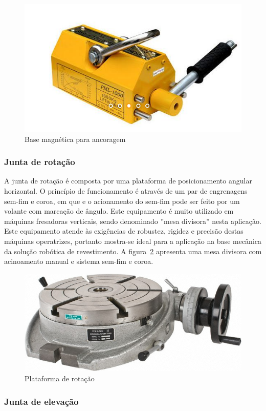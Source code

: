\begin{figure}[h!]
	\centering
	\includegraphics[width=0.5\columnwidth]{method/figs/construcao/base_magnetica}
	\caption{Base magnética para ancoragem}
    \label{fig::base_magnetica}
\end{figure}

\subsubsection{Junta de rotação}

A junta de rotação é composta por uma plataforma de posicionamento angular
horizontal.
O princípio de funcionamento é através de um par de engrenagens sem-fim e coroa,
em que e o acionamento do sem-fim pode ser feito por um volante com marcação de
ângulo. Este equipamento é muito utilizado em máquinas fresadoras verticais,
sendo denominado ''mesa divisora'' nesta aplicação.
Este equipamento atende às exigências de robustez, rigidez e precisão destas
máquinas operatrizes, portanto mostra-se ideal para a aplicação na base mecânica
da solução robótica de revestimento. A figura~\ref{fig::rotary_table} apresenta
uma mesa divisora com acinoamento manual e sistema sem-fim e coroa.

\begin{figure}[h!]
	\centering
	\includegraphics[width=0.6\columnwidth]{method/figs/construcao/rotary_table}
	\caption{Plataforma de rotação}
    \label{fig::rotary_table}
\end{figure}

\subsubsection{Junta de elevação}

